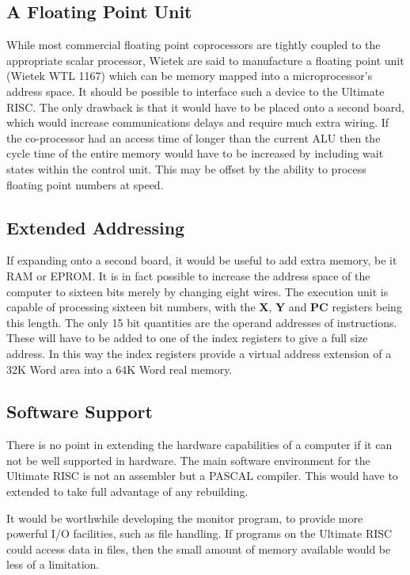 \subsection{A Floating Point Unit}

While most commercial floating point coprocessors are  tightly coupled to the appropriate scalar processor, Wietek are said to manufacture a floating point unit (Wietek WTL 1167) which can be memory mapped into a microprocessor's address space.
 It should  be possible to interface such a device to the Ultimate RISC. 
The only drawback is that it would have to be placed onto a second board, which would increase communications delays and require much extra wiring. If the co-processor had an access time of longer than the current ALU then the cycle time of the entire memory would have to be increased by including wait states within the control unit. 
This may be offset by the ability to process floating point numbers at speed.

\subsection{Extended Addressing}

If  expanding onto a second board,  it would be useful to add extra memory, be it RAM or EPROM. It is in fact possible to increase the address space of the computer to sixteen bits merely by changing eight wires. 
The execution unit is capable of processing sixteen bit numbers, with the {\bf X}, {\bf Y} and {\bf PC} registers being this length. The only 15 bit quantities are the operand addresses of instructions. 
These will have to be added to one of the index registers to give a full size address. In this way the index registers provide a virtual address extension of a 32K Word area into a 64K Word real memory. 

\subsection{Software Support}
There is no point in extending the hardware capabilities of a computer if it can not be well supported in hardware. 
The main software environment for the Ultimate RISC is not an assembler but a PASCAL compiler. 
This would have to extended to take full advantage of any rebuilding.

It would be worthwhile developing the monitor program, to provide more powerful I/O
facilities, such as file handling. If programs on the Ultimate RISC could access data in files, then the small amount of memory available would be less of a limitation.
 

